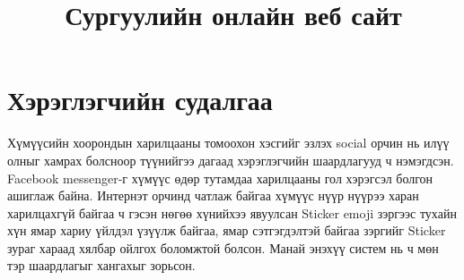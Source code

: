 \documentclass[12pt]{article}
\title{Сургуулийн онлайн веб сайт}
\begin{document}
	\maketitle
	\section{Хэрэглэгчийн судалгаа}
	Хүмүүсийн хоорондын харилцааны томоохон хэсгийг эзлэх social орчин нь илүү олныг хамрах болсноор түүнийгээ дагаад хэрэглэгчийн шаардлагууд ч нэмэгдсэн. Facebook messenger-г хүмүүс өдөр тутамдаа харилцааны гол хэрэгсэл болгон ашиглаж байна. Интернэт орчинд чатлаж байгаа хүмүүс нүүр нүүрээ харан харилцахгүй байгаа ч гэсэн нөгөө хүнийхээ явуулсан Sticker emoji зэргээс тухайн хүн ямар хариу үйлдэл үзүүлж байгаа, ямар сэтгэгдэлтэй байгаа зэргийг Sticker зураг хараад хялбар ойлгох боломжтой болсон. Манай энэхүү систем нь ч мөн тэр шаардлагыг хангахыг зорьсон.
\end{document}
